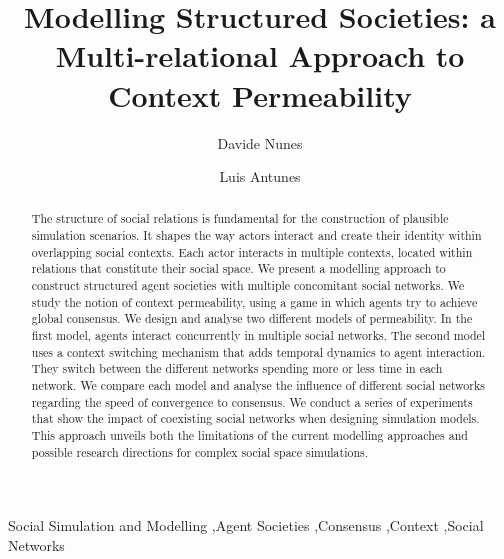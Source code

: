 \documentclass[preprint,number]{elsarticle}
\begin{document}
	\begin{frontmatter}
		
		\author[ul]{Davide Nunes}
		\author[ul]{Luis Antunes}
		
		
		\address[ul]{Group of Studies in Social Simulation (GUESS), Laboratory of Agent Modelling, Faculdade de Ciências, Universidade de Lisboa, 1749-016 Lisboa, Portugal}
		\title{Modelling Structured Societies: a Multi-relational Approach to Context Permeability}
		
		\begin{abstract}
			The structure of social relations is fundamental for the construction of plausible simulation scenarios. It shapes the way actors interact and create their identity within overlapping social contexts. Each actor interacts in multiple contexts, located within relations that constitute their social space. We present a modelling approach to construct structured agent societies with multiple concomitant social networks. We study the notion of context permeability, using a game in which agents try to achieve global consensus. We design and analyse two different models of permeability. In the first model, agents interact concurrently in multiple social networks. The second model uses a context switching mechanism that adds temporal dynamics to agent interaction. They switch between the different networks spending more or less time in each network. We compare each model and analyse the influence of different social networks regarding the speed of convergence to consensus. We conduct a series of experiments that show the impact of coexisting social networks when designing simulation models. This approach unveils both the limitations of the current modelling approaches and possible research directions for complex social space simulations.
		\end{abstract} 
		
		\begin{keyword}
			Social Simulation and Modelling \sep Agent Societies \sep Consensus \sep Context \sep Social Networks
		\end{keyword}

\end{frontmatter}
	\newpage
\end{document}
